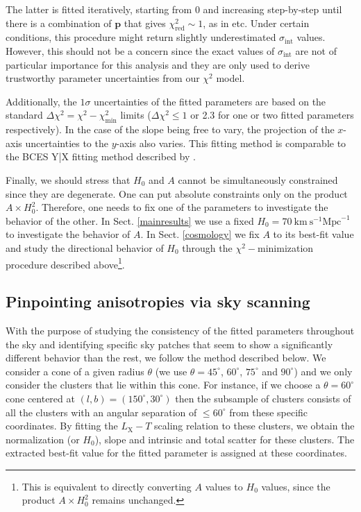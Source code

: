 \documentclass{aa}   %
\begin{document}
The latter is fitted iteratively, starting from $0$ and increasing step-by-step until there is a combination of $\mathbf{p}$ that gives $\chi^2_{\text{red}}\sim 1$, as in \citet{Maughan07, maughan, zou} etc. Under certain conditions, this procedure might return slightly underestimated $\sigma_{\text{int}}$ values. However, this should not be a concern since the exact values of $\sigma_{\text{int}}$ are not of particular importance for this analysis and they are only used to derive trustworthy parameter uncertainties from our $\chi^2$ model.

Additionally, the $1\sigma$ uncertainties of the fitted parameters are based on the standard $\Delta\chi^2=\chi^2-\chi^2_{\text{min}}$ limits ($\Delta\chi^2\leq 1$ or 2.3 for one or two fitted parameters respectively). In the case of the slope being free to vary, the projection of the $x$-axis uncertainties to the $y$-axis also varies. This fitting method is comparable to the BCES Y|X fitting method described by \citet{akritas}. 

Finally, we should stress that $H_0$ and $A$ cannot be simultaneously constrained since they are degenerate. One can put absolute constraints only on the product $A\times H_0^2$. Therefore, one needs to fix one of the parameters to investigate the behavior of the other. In Sect. \ref{mainresults} we use a fixed $H_0=70\  \text{km}\  \text{s}^{-1} \text{Mpc}^{-1}$ to investigate the behavior of $A$. In Sect. \ref{cosmology} we fix $A$ to its best-fit value and study the directional behavior of $H_0$ through the $\chi^2-$minimization procedure described above\footnote{This is equivalent to directly converting $A$ values to $H_0$ values, since the product $A\times H_0^2$ remains unchanged.}.


\subsection{Pinpointing anisotropies via sky scanning} \label{scan}

With the purpose of studying the consistency of the fitted parameters throughout the sky and identifying specific sky patches that seem to show a significantly different behavior than the rest, we follow the method described below. 
We consider a cone of a given radius $\theta$ (we use $\theta =45^{\circ}$, $60^{\circ}$, $75^{\circ}$ and $90^{\circ}$) and we only consider the clusters that lie within this cone. For instance, if we choose a $\theta=60^{\circ}$ cone centered at $(l,b)=(150^{\circ},30^{\circ})$ then the subsample of clusters consists of all the clusters with an angular separation of $\leq 60^{\circ}$ from these specific coordinates. By fitting the $L_{\text{X}}-T$ scaling relation to these clusters, we obtain the normalization (or $H_0$), slope and intrinsic and total scatter for these clusters. The extracted best-fit value for the fitted parameter is assigned at these coordinates.
\end{document}
